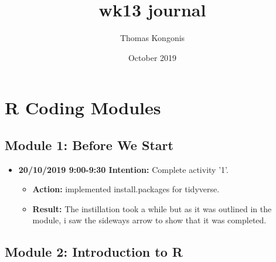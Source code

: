 \documentclass{article}
\title{wk13 journal}
\author{Thomas Kongonis}
\date{October 2019}
\begin{document}
\maketitle

\tableofcontents

\section{R Coding Modules}

\subsection{Module 1: Before We Start}
\begin{itemize}
\item{\textbf{20/10/2019 9:00-9:30 Intention:} Complete activity '1'.}

\begin{itemize}
\item{\textbf{Action:} implemented install.packages for tidyverse.}
\item{\textbf{Result:} The instillation took a while but as it was outlined in the module, i saw the sideways arrow to show that it was completed.}
\end{itemize}
\end{itemize}


\subsection{Module 2: Introduction to R}
\end{document}

